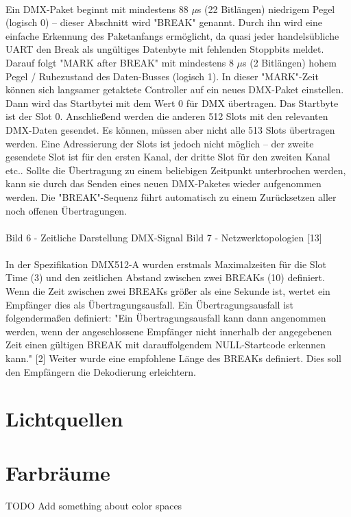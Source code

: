 \documentclass{scrartcl}
\begin{document}
\\
Ein DMX-Paket beginnt mit mindestens 88 $\mu$s (22 Bitlängen) niedrigem Pegel (logisch 0) – dieser
Abschnitt wird "BREAK" genannt. Durch ihn wird eine einfache Erkennung des Paketanfangs
ermöglicht, da quasi jeder handelsübliche UART den Break als ungültiges Datenbyte mit fehlenden
Stoppbits meldet. Darauf folgt "MARK after BREAK" mit mindestens 8 $\mu$s (2 Bitlängen) hohem Pegel /
Ruhezustand des Daten-Busses (logisch 1). In dieser "MARK"-Zeit können sich langsamer getaktete
Controller auf ein neues DMX-Paket einstellen. Dann wird das Startbytei mit dem Wert 0 für DMX
übertragen. Das Startbyte ist der Slot 0. Anschließend werden die anderen 512 Slots mit den
relevanten DMX-Daten gesendet. Es können, müssen aber nicht alle 513 Slots übertragen werden.
Eine Adressierung der Slots ist jedoch nicht möglich – der zweite gesendete Slot ist für den ersten
Kanal, der dritte Slot für den zweiten Kanal etc.. Sollte die Übertragung zu einem beliebigen
Zeitpunkt unterbrochen werden, kann sie durch das Senden eines neuen DMX-Paketes wieder
aufgenommen werden. Die "BREAK"-Sequenz führt automatisch zu einem Zurücksetzen aller noch
offenen Übertragungen.\\
\\
Bild 6 - Zeitliche Darstellung DMX-Signal
Bild 7 - Netzwerktopologien [13]\\
\\
In der Spezifikation DMX512-A wurden erstmals Maximalzeiten für die Slot Time (3) und den
zeitlichen Abstand zwischen zwei BREAKs (10) definiert. Wenn die Zeit zwischen zwei BREAKs größer
als eine Sekunde ist, wertet ein Empfänger dies als Übertragungsausfall. Ein Übertragungsausfall ist
folgendermaßen definiert: "Ein Übertragungsausfall kann dann angenommen werden, wenn der
angeschlossene Empfänger nicht innerhalb der angegebenen Zeit einen gültigen BREAK mit
darauffolgendem NULL-Startcode erkennen kann." [2] Weiter wurde eine empfohlene Länge des
BREAKs definiert. Dies soll den Empfängern die Dekodierung erleichtern.
\clearpage

\section{Lichtquellen}
\clearpage

\section{Farbräume}
TODO Add something about color spaces
\clearpage
\end{document}
